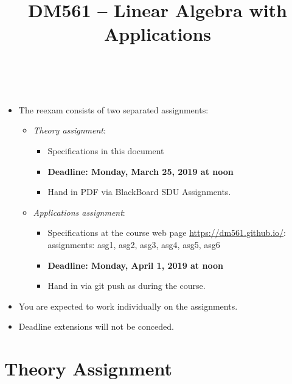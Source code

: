 \documentclass[a4paper,10pt]{article}
\title{%
\begin{flushleft}
DM561 -- Linear Algebra with Applications\\[0.3cm]
\hrulefill
\\[-1.8cm]
\end{flushleft}
}
\author{}
\date{}
\begin{document}
\maketitle







\medskip

\begin{itemize}

\itemsep=1ex

\item The reexam consists of two separated assignments:

\begin{itemize}

\item \emph{Theory assignment}:
  \begin{itemize}
\item Specifications in this document
\item {\bf Deadline: Monday, March 25, 2019 at noon}
\item Hand in PDF via BlackBoard SDU Assignments.
  \end{itemize}
  
\item \emph{Applications assignment}:
  \begin{itemize}
  \item Specifications at the course web page
    \url{https://dm561.github.io/}:\\ assignments: asg1, asg2, asg3, asg4,
    asg5, asg6
  \item {\bf Deadline: Monday, April 1, 2019 at noon}
  \item Hand in via git push as during the course.
  \end{itemize}
\end{itemize}
  


\item You are expected to work individually on the assignments.

  
\item Deadline extensions will not be conceded.
\end{itemize}


\clearpage

\section*{Theory Assignment}
\end{document}

